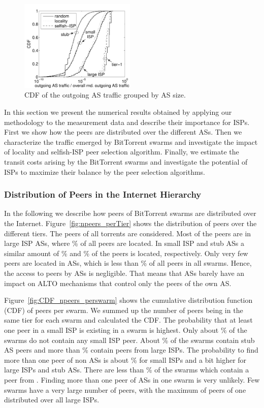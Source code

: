\begin{figure}
	\centering
	\includegraphics[width=0.49\textwidth]{aslevel/p2p/results/figs/outgoing_CDF}
 	\caption{CDF of the outgoing AS traffic grouped by AS size.}
 	\label{fig:outgoing_CDF}
\end{figure}

In this section we present the numerical results obtained by applying our methodology to the measurement data and describe their importance for ISPs. First we show how the peers are distributed over the different ASs. Then we characterize the traffic emerged by BitTorrent swarms and investigate the impact of locality and selfish-ISP peer selection algorithm. Finally, we estimate the transit costs arising by the BitTorrent swarms and investigate the potential of ISPs to maximize their balance by the peer selection algorithms.

\subsubsection{Distribution of Peers in the Internet Hierarchy}
In the following we describe how peers of BitTorrent swarms are distributed over the Internet.
Figure~\ref{fig:npeers_perTier} shows the distribution of peers over the different tiers. The peers of all torrents are considered. Most of the peers are in large ISP ASs, where \unit[40]{\%} of all peers are located. In small ISP and stub ASs a similar amount of \unit[29]{\%} and \unit[31]{\%} of the peers is located, respectively. Only very few peers are located in \tier ASs, which is less than \unit[1]{\%} of all peers in all swarms. Hence, the access to peers by \tier ASs is negligible. That means that \tier ASs barely have an impact on ALTO mechanisms that control only the peers of the own AS.

Figure~\ref{fig:CDF_npeers_perswarm} shows the cumulative distribution function (CDF) of peers per swarm. We summed up the number of peers being in the same tier for each swarm and calculated the CDF. The probability that at least one peer in a small ISP is existing in a swarm is highest. Only about \unit[2]{\%} of the swarms do not contain any small ISP peer. About \unit[57]{\%} of the swarms contain stub AS peers and more than \unit[60]{\%} contain peers from large ISPs. The probability to find more than one peer of non \tier ASs is about \unit[45]{\%} for small ISPs and a bit higher for large ISPs and stub ASs. There are less than \unit[10]{\%} of the swarms which contain a peer from \tier. Finding more than one peer of \tier ASs in one swarm is very unlikely. Few swarms have a very large number of peers, with the maximum of  peers of one distributed over all large ISPs.

